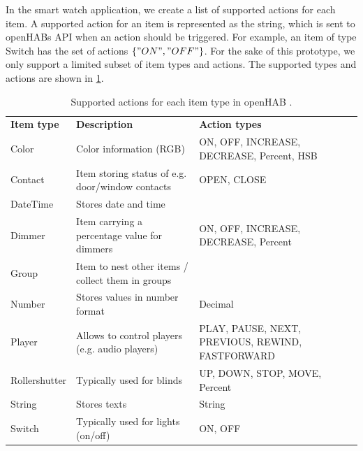 In the smart watch application, we create a list of supported actions for each item. A supported action for an item is represented as the string, which is sent to openHABs API when an action should be triggered. For example, an item of type Switch has the set of actions $\{ "ON", "OFF" \}$. For the sake of this prototype, we only support a limited subset of item types and actions. The supported types and actions are shown in \cref{tbl:design:communication-with-openhab:types}.

\begin{table}[]
\centering
\caption{Supported actions for each item type in openHAB \cite{eclipse:smarthomeitems}.}
\label{tbl:design:communication-with-openhab:types}
\begin{tabular}{p{2cm}p{6cm}p{6cm}}
\textbf{Item type} & \textbf{Description}                              & \textbf{Action types}                      \\ 
Color              & Color information (RGB)                           & ON, OFF, INCREASE, DECREASE, Percent, HSB      \\
Contact            & Item storing status of e.g. door/window contacts  & OPEN, CLOSE                                  \\
DateTime           & Stores date and time                              &                                            \\
Dimmer             & Item carrying a percentage value for dimmers      & ON, OFF, INCREASE, DECREASE, Percent           \\
Group              & Item to nest other items / collect them in groups &                                            \\
Number             & Stores values in number format                    & Decimal                                    \\
Player             & Allows to control players (e.g. audio players)    & PLAY, PAUSE, NEXT, PREVIOUS, REWIND, FASTFORWARD \\
Rollershutter      & Typically used for blinds                         & UP, DOWN, STOP, MOVE, Percent                  \\
String             & Stores texts                                      & String                                     \\
Switch             & Typically used for lights (on/off)                & ON, OFF                                     
\end{tabular}
\end{table}


